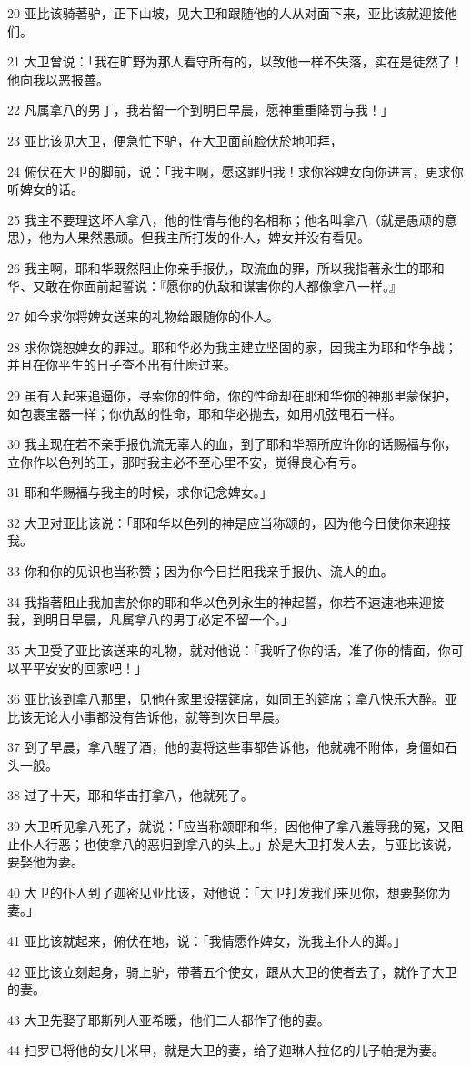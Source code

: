 \par 20 亚比该骑著驴，正下山坡，见大卫和跟随他的人从对面下来，亚比该就迎接他们。
\par 21 大卫曾说：「我在旷野为那人看守所有的，以致他一样不失落，实在是徒然了！他向我以恶报善。
\par 22 凡属拿八的男丁，我若留一个到明日早晨，愿神重重降罚与我！」
\par 23 亚比该见大卫，便急忙下驴，在大卫面前脸伏於地叩拜，
\par 24 俯伏在大卫的脚前，说：「我主啊，愿这罪归我！求你容婢女向你进言，更求你听婢女的话。
\par 25 我主不要理这坏人拿八，他的性情与他的名相称；他名叫拿八（就是愚顽的意思），他为人果然愚顽。但我主所打发的仆人，婢女并没有看见。
\par 26 我主啊，耶和华既然阻止你亲手报仇，取流血的罪，所以我指著永生的耶和华、又敢在你面前起誓说：『愿你的仇敌和谋害你的人都像拿八一样。』
\par 27 如今求你将婢女送来的礼物给跟随你的仆人。
\par 28 求你饶恕婢女的罪过。耶和华必为我主建立坚固的家，因我主为耶和华争战；并且在你平生的日子查不出有什麽过来。
\par 29 虽有人起来追逼你，寻索你的性命，你的性命却在耶和华你的神那里蒙保护，如包裹宝器一样；你仇敌的性命，耶和华必抛去，如用机弦甩石一样。
\par 30 我主现在若不亲手报仇流无辜人的血，到了耶和华照所应许你的话赐福与你，立你作以色列的王，那时我主必不至心里不安，觉得良心有亏。
\par 31 耶和华赐福与我主的时候，求你记念婢女。」
\par 32 大卫对亚比该说：「耶和华以色列的神是应当称颂的，因为他今日使你来迎接我。
\par 33 你和你的见识也当称赞；因为你今日拦阻我亲手报仇、流人的血。
\par 34 我指著阻止我加害於你的耶和华以色列永生的神起誓，你若不速速地来迎接我，到明日早晨，凡属拿八的男丁必定不留一个。」
\par 35 大卫受了亚比该送来的礼物，就对他说：「我听了你的话，准了你的情面，你可以平平安安的回家吧！」
\par 36 亚比该到拿八那里，见他在家里设摆筵席，如同王的筵席；拿八快乐大醉。亚比该无论大小事都没有告诉他，就等到次日早晨。
\par 37 到了早晨，拿八醒了酒，他的妻将这些事都告诉他，他就魂不附体，身僵如石头一般。
\par 38 过了十天，耶和华击打拿八，他就死了。
\par 39 大卫听见拿八死了，就说：「应当称颂耶和华，因他伸了拿八羞辱我的冤，又阻止仆人行恶；也使拿八的恶归到拿八的头上。」於是大卫打发人去，与亚比该说，要娶他为妻。
\par 40 大卫的仆人到了迦密见亚比该，对他说：「大卫打发我们来见你，想要娶你为妻。」
\par 41 亚比该就起来，俯伏在地，说：「我情愿作婢女，洗我主仆人的脚。」
\par 42 亚比该立刻起身，骑上驴，带著五个使女，跟从大卫的使者去了，就作了大卫的妻。
\par 43 大卫先娶了耶斯列人亚希暖，他们二人都作了他的妻。
\par 44 扫罗已将他的女儿米甲，就是大卫的妻，给了迦琳人拉亿的儿子帕提为妻。

